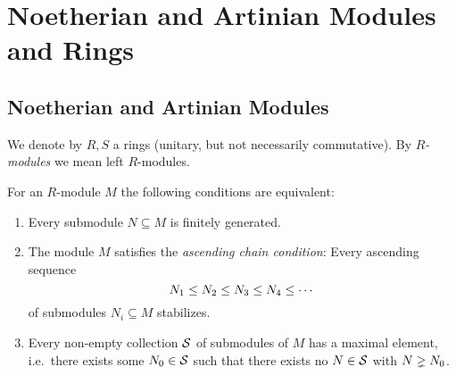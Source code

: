 \section{Noetherian and Artinian Modules and Rings}





\subsection{Noetherian and Artinian Modules}


\begin{conventions}
  We denote by $R, S$ a rings (unitary, but not necessarily commutative).
  By \emph{$R$-modules} we mean left $R$-modules.
\end{conventions}


\begin{lemma}
  \label{lemma: characterizations of noetherian}
  For an $R$-module $M$ the following conditions are equivalent:
  \begin{enumerate}
    \item
      Every submodule $N \subseteq M$ is finitely generated.
    \item
      The module $M$ satisfies the \emph{ascending chain condition}:
      Every ascending sequence
      \[
                    N_1
        \leq  N_2
        \leq  N_3
        \leq  N_4
        \leq  \dotsb
      \]
      of submodules $N_i \subseteq M$ stabilizes.
    \item
      Every non-empty collection $\mathcal{S}$ of submodules of $M$ has a maximal element, i.e.\ there exists some $N_0 \in \mathcal{S}$ such that there exists no $N \in \mathcal{S}$ with $N \gneq N_0$.
  \end{enumerate}
\end{lemma}


